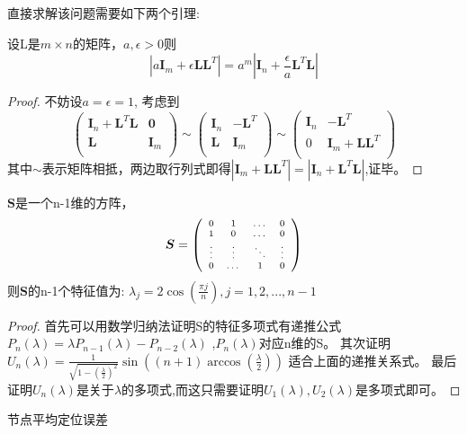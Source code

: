 直接求解该问题需要如下两个引理:
\begin{lemma}\label{lemma:change}
设L是$m\times n$的矩阵，$a,\epsilon > 0$则
\begin{equation}
|a\bm{I}_m+\epsilon \bm{L}\bm{L}^T|=a^m|\bm{I}_n+\frac{\epsilon}{a} \bm{L}^T\bm{L}|
\end{equation}
\end{lemma}
\begin{proof}
不妨设$a=\epsilon=1$,
考虑到
\[
\left(\begin{array}{cc}
\bm{I}_n+\bm{L}^T\bm{L}&\bm{0}\\
\bm{L}&\bm{I}_m\\
\end{array}\right)\sim\left(\begin{array}{cc}
\bm{I}_n&-\bm{L}^T\\
\bm{L}&\bm{I}_m\\
\end{array}\right)\sim\left(\begin{array}{cc}
\bm{I}_n&-\bm{L}^T\\
0&\bm{I}_m+\bm{L}\bm{L}^T\\
\end{array}\right)
\]
其中$\sim$表示矩阵相抵，两边取行列式即得$|\bm{I}_m+\bm{L}\bm{L}^T|=|\bm{I}_n+\bm{L}^T\bm{L}|$,证毕。
\end{proof}


\begin{lemma}\label{lemma:special}
$\bm{S}$是一个n-1维的方阵，\[
\scriptsize{\bm{S}=\left(
\begin{array}{cccc}
0&1&\dots&0\\
1&0&\dots&0\\
\vdots&\vdots&\ddots&\vdots\\
0&\dots&1&0\\
\end{array}\right)}
\]则$\bm{S}$的n-1个特征值为:
$\lambda_j=2\cos(\frac{\pi j}{n}),j=1,2,...,n-1$
\end{lemma}
\begin{proof}
首先可以用数学归纳法证明S的特征多项式有递推公式$P_n(\lambda)=\lambda P_{n-1}(\lambda)-P_{n-2}(\lambda)$
,$P_n(\lambda)$对应n维的S。
其次证明
$U_n(\lambda)=\frac{1}{\sqrt{1-(\frac{\lambda}{2})^2}}\sin((n+1)\arccos(\frac{\lambda}{2}))
$
适合上面的递推关系式。
最后证明$U_n(\lambda)$是关于$\lambda$的多项式,而这只需要证明$U_1(\lambda),U_2(\lambda)$是多项式即可。
\end{proof}

{节点平均定位误差}

